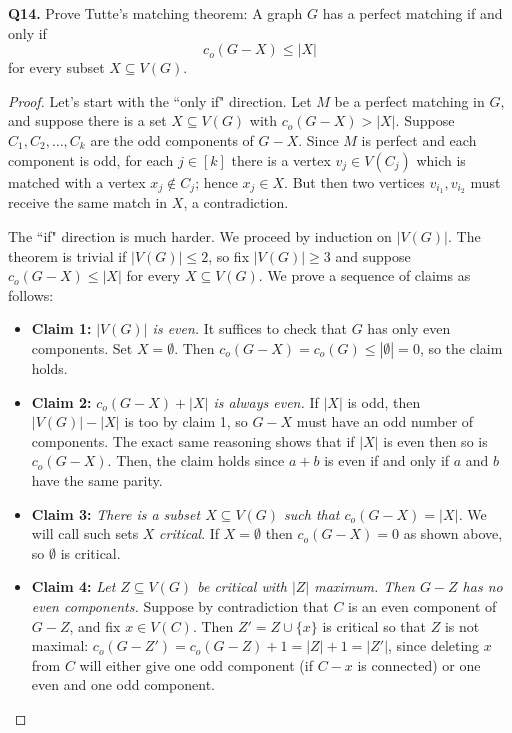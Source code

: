 \noindent \textbf{Q14.} Prove Tutte's matching theorem: A graph \( G \) has a perfect matching if and only if \[ c_{o} (G - X) \leq |X| \] for every subset \( X \subseteq V(G) \).
\begin{proof}
Let's start with the ``only if" direction. Let \( M \) be a perfect matching in \( G \), and suppose there is a set \( X \subseteq V(G) \) with \( c_{o}(G - X) > |X|  \). Suppose \( C_1, C_2, \hdots , C_{k}  \) are the odd components of \( G - X \). Since \( M \) is perfect and each component is odd, for each \( j \in [k] \) there is a vertex \( v_{j} \in V(C_{j}) \) which is matched with a vertex \(x_{j} \notin C_{j}  \); hence \( x_{j} \in X \). But then two vertices \( v_{i_1} , v_{i_2}  \) must receive the same match in \( X \), a contradiction.

The ``if" direction is much harder. We proceed by induction on \( |V(G)| \). The theorem is trivial if \( |V(G)| \leq 2 \), so fix \( |V(G)| \geq 3 \) and suppose \( c_{o} (G - X) \leq |X| \) for every \( X \subseteq V(G) \). We prove a sequence of claims as follows:
\begin{itemize}[nolistsep]
	\item \textbf{Claim 1:}	\emph{\( |V(G)| \) is even.} It suffices to check that \( G \) has only even components. Set \( X = \emptyset  \). Then \( c_{o} (G - X) = c_{o} (G) \leq |\emptyset | = 0 \), so the claim holds.
	\item \textbf{Claim 2:} \emph{\( c_{o} (G - X) + |X| \) is always even.} If \( |X| \) is odd, then \( |V(G)| - |X| \) is too by claim 1, so \( G - X \) must have an odd number of components. The exact same reasoning shows that if \( |X| \) is even then so is \( c_{o} (G - X) \). Then, the claim holds since \( a + b \) is even if and only if \( a \) and \( b \) have the same parity.
	\item \textbf{Claim 3:} \emph{There is a subset \( X \subseteq V(G) \) such that \( c_{o} (G - X) = |X| \).} We will call such sets \( X \) \emph{critical}. If \( X = \emptyset  \) then \( c_{o} (G - X) = 0  \) as shown above, so \( \emptyset  \) is critical.
	\item \textbf{Claim 4:} \emph{Let \( Z \subseteq V(G) \) be critical with \( |Z| \) maximum. Then \( G - Z \) has no even components.} Suppose by contradiction that \( C \) is an even component of \( G - Z \), and fix \( x \in V(C) \). Then \( Z' = Z \cup \{ x \}  \) is critical so that \( Z \) is not maximal: \( c_{o} (G - Z') = c_{o} (G - Z) + 1 = |Z| + 1 = |Z'|  \), since deleting \( x \) from \( C \) will either give one odd component (if \( C - x \) is connected) or one even and one odd component.

\end{itemize}
\end{proof}

